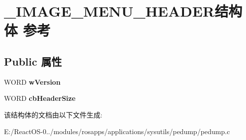 \hypertarget{struct___i_m_a_g_e___m_e_n_u___h_e_a_d_e_r}{}\section{\+\_\+\+I\+M\+A\+G\+E\+\_\+\+M\+E\+N\+U\+\_\+\+H\+E\+A\+D\+E\+R结构体 参考}
\label{struct___i_m_a_g_e___m_e_n_u___h_e_a_d_e_r}
\subsection*{Public 属性}
\begin{DoxyCompactItemize}
\item 
\mbox{\label{struct___i_m_a_g_e___m_e_n_u___h_e_a_d_e_r_a74aa31dda6751c378f8d69d062a97b18}} 
W\+O\+RD {\bfseries w\+Version}
\item 
\mbox{\label{struct___i_m_a_g_e___m_e_n_u___h_e_a_d_e_r_a4aeaedcae81a5086a893ab3504caae00}} 
W\+O\+RD {\bfseries cb\+Header\+Size}
\end{DoxyCompactItemize}


该结构体的文档由以下文件生成\+:\begin{DoxyCompactItemize}
\item 
E\+:/\+React\+O\+S-\/0../modules/rosapps/applications/sysutils/pedump/pedump.\+c\end{DoxyCompactItemize}
